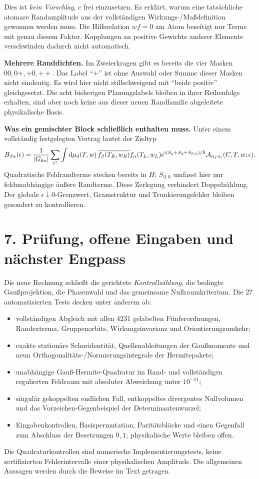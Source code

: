 \documentclass[10pt,a4paper]{article}
\newcommand{\dd}{\mathrm d}
\newcommand{\ii}{\mathrm i}
\newcommand{\sect}[1]{\section*{\color{navy}#1}}
\begin{document}
Dies ist \emph{kein Vorschlag}, $c$ frei einzusetzen. Es erklärt, warum
eine tatsächliche atomare Randamplitude aus der vollständigen
Wirkungs-/Maßdefinition gewonnen werden muss. Die Hilfsrelation $wf=0$
am Atom beseitigt nur Terme mit genau diesem Faktor. Kopplungen an
positive Gewichte anderer Elemente verschwinden dadurch nicht automatisch.

\textbf{Mehrere Randdichten.} Im Zweierkragen gibt es bereits die vier
Masken $00,0+,+0,++$. Das Label ``$+$'' ist ohne Auswahl oder Summe dieser
Masken nicht eindeutig. Es wird hier nicht stillschweigend mit ``beide
positiv'' gleichgesetzt. Die acht bisherigen Planungslabels bleiben in
ihrer Reihenfolge erhalten, sind aber noch keine aus dieser neuen
Randfamilie abgeleitete physikalische Basis.

\textbf{Was ein gemischter Block schließlich enthalten muss.}
Unter einem vollständig festgelegten Vertrag lautet der Zieltyp
\[
B_{\beta\alpha}(\epsilon)=\frac1{|G_{\rm fix}|}
\sum_C\int\dd\mu_d(T,w)\,
\overline{f_\beta(T_R,w_R)}f_\alpha(T_L,w_L)
e^{\ii(S_g+S_d+S_{\partial,0})/\hbar}
\mathcal A_{n_fn_i}(C,T,w;\epsilon).
\]
Quadratische Feldrandterme stecken bereits in $H$; $S_{\partial,0}$ umfasst
hier nur feldunabhängige äußere Randterme. Diese Zerlegung verhindert
Doppelzählung. Der globale $\epsilon\downarrow0$-Grenzwert, Gramstruktur
und Trunkierungsfehler bleiben gesondert zu kontrollieren.

\newpage
\sect{7. Prüfung, offene Eingaben und nächster Engpass}
Die neue Rechnung schließt die gerichtete \emph{Kontrollzählung}, die
bedingte Gaußprojektion, die Phasenwahl und das gemeinsame Nullraumkriterium.
Die 27 automatisierten Tests decken unter anderem ab:
\begin{itemize}
\setlength\itemsep{1pt}
\item vollständigen Abgleich mit allen 4231 gelabelten Fünferordnungen,
      Randextrema, Gruppenorbits, Wirkungsinvarianz und Orientierungsumkehr;
\item exakte stationäre Schuridentität, Quellenableitungen der Gaußmomente
      und neun Orthogonalitäts-/Normierungsintegrale der Hermitepakete;
\item unabhängige Gauß-Hermite-Quadratur im Rand- und vollständigen
      regulierten Feldraum mit absoluter Abweichung unter $10^{-11}$;
\item singulär gekoppelten endlichen Fall, entkoppeltes divergentes
      Nullvolumen und das Vorzeichen-Gegenbeispiel der Determinantenwurzel;
\item Eingabenkontrollen, Basispermutation, Paritätsblöcke und einen
      Gegenfall zum Abschluss der Besetzungen $0,1$; physikalische Werte bleiben offen.
\end{itemize}
Die Quadraturkontrollen sind numerische Implementierungstests, keine
zertifizierten Fehlerintervalle einer physikalischen Amplitude. Die
allgemeinen Aussagen werden durch die Beweise im Text getragen.
\end{document}
